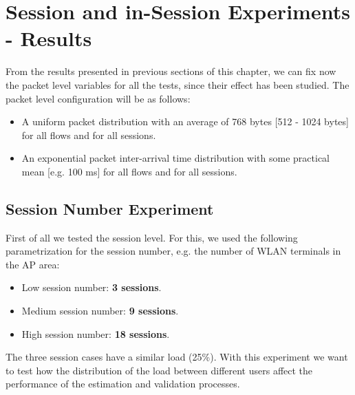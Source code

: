 \section{Session and in-Session Experiments - Results} \label{sec:final-results}
From the results presented in previous sections of this chapter, we can fix now the packet level variables for all the tests, since their effect has been studied. The packet level configuration will be as follows:

\begin{itemize}
\item A uniform packet distribution with an average of 768 bytes [512 - 1024 bytes] for all flows and for all sessions.
\item An exponential packet inter-arrival time distribution with some practical mean [e.g. 100 ms] for all flows and for all sessions.
\end{itemize}

\subsection{Session Number Experiment} \label{sec:gv_session_exp}
First of all we tested the session level. For this, we used the following parametrization for the session number, e.g. the number of \acs{WLAN} terminals in the \acs{AP} area:

\begin{itemize}
	\item Low session number: \textbf{3 sessions}.
	\item Medium session number: \textbf{9 sessions}.
	\item High session number: \textbf{18 sessions}.
\end{itemize}

The three session cases have a similar load (25\%). With this experiment we want to test how the distribution of the load between different users affect the performance of the estimation and validation processes.

